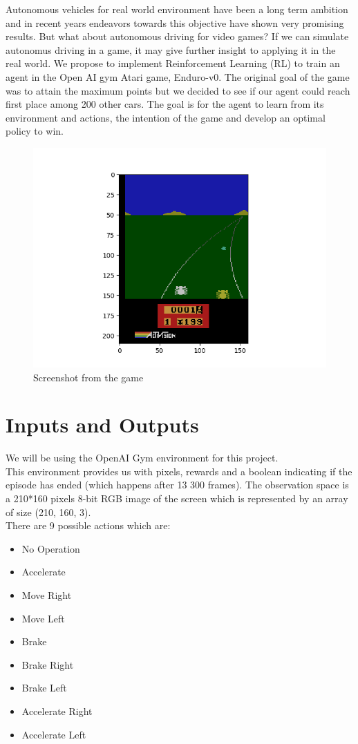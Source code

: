 \documentclass[10pt,twocolumn,letterpaper]{article}
\begin{document}
Autonomous vehicles for real world environment have been a long term ambition and in recent years endeavors towards this objective have shown very promising results. But what about autonomous driving for video games? If we can simulate autonomus driving in a game, it may give further insight to applying it in the real world. We propose to implement Reinforcement Learning (RL) to train an agent in the Open AI gym Atari game, Enduro-v0. The original goal of the game was to attain the maximum points but we decided to see if our agent could reach first place among 200 other cars. The goal is for the agent to learn from its environment and actions, the intention of the game and develop an optimal policy to win.
\begin{figure}[h]
\centering
\includegraphics[width=0.8\linewidth]{img81.png}
\caption{Screenshot from the game}
\end{figure}

\section*{Inputs and Outputs}

We will be using the OpenAI Gym environment for this project. \\
This environment provides us with pixels, rewards and a boolean indicating if the episode has ended (which happens after 13 300 frames). The observation space is a 210*160 pixels 8-bit RGB image of the screen which is represented by an array of size (210, 160, 3).\\
There are 9 possible actions which are:
\begin{itemize}
\itemsep-0.2em 
\item No Operation
\item Accelerate
\item Move Right
\item Move Left
\item Brake
\item Brake Right
\item Brake Left
\item Accelerate Right
\item Accelerate Left
\end{itemize}
\end{document}
